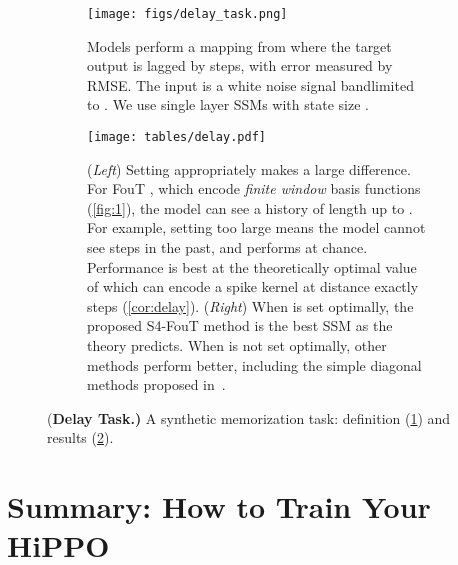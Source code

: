\documentclass{article}
\begin{document}
\begin{figure}[!ht]
\begin{subfigure}{\linewidth}\centering
    \texttt{[image: figs/delay\_task.png]}
    \caption{
      Models perform a mapping from  where the target output is lagged by  steps, with error measured by RMSE.
      The input is a white noise signal bandlimited to .
      We use single layer SSMs with state size .
    }
    \label{fig:delay-task}
\end{subfigure}
\begin{subfigure}{\linewidth}\centering
    \texttt{[image: tables/delay.pdf]}
    \caption{
      (\emph{Left}) Setting  appropriately makes a large difference.
      For FouT , which encode \emph{finite window} basis functions (\cref{fig:1}),
      the model can see a history of length up to .
      For example, setting  too large means the model cannot see  steps in the past, and performs at chance.
      Performance is best at the theoretically optimal value of  which can encode a spike kernel at distance exactly  steps (\cref{cor:delay}).
      (\emph{Right}) When  is set optimally, the proposed S4-FouT method is the best SSM as the theory predicts.
      When  is not set optimally, other methods perform better, including the simple diagonal methods proposed in~\citep{gu2022s4d}.
    }
    \label{fig:delay-results}
\end{subfigure}
\caption{(\textbf{Delay Task.)} A synthetic memorization task: definition (\cref{fig:delay-task}) and results (\cref{fig:delay-results}).}
\label{fig:delay}
\end{figure}

 
\section{Summary: How to Train Your HiPPO}
\end{document}
